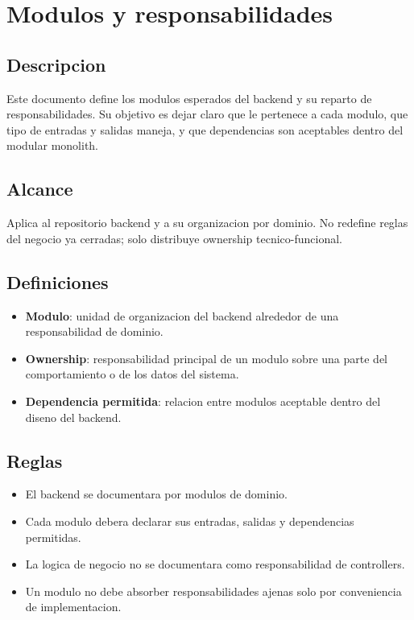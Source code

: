 \section{Modulos y responsabilidades}

\subsection{Descripcion}

Este documento define los modulos esperados del backend y su reparto de responsabilidades. Su objetivo es dejar claro que le pertenece a cada modulo, que tipo de entradas y salidas maneja, y que dependencias son aceptables dentro del modular monolith.

\subsection{Alcance}

Aplica al repositorio backend y a su organizacion por dominio. No redefine reglas del negocio ya cerradas; solo distribuye ownership tecnico-funcional.

\subsection{Definiciones}

\begin{itemize}
  \item \textbf{Modulo}: unidad de organizacion del backend alrededor de una responsabilidad de dominio.
  \item \textbf{Ownership}: responsabilidad principal de un modulo sobre una parte del comportamiento o de los datos del sistema.
  \item \textbf{Dependencia permitida}: relacion entre modulos aceptable dentro del diseno del backend.
\end{itemize}

\subsection{Reglas}

\begin{itemize}
  \item El backend se documentara por modulos de dominio.
  \item Cada modulo debera declarar sus entradas, salidas y dependencias permitidas.
  \item La logica de negocio no se documentara como responsabilidad de controllers.
  \item Un modulo no debe absorber responsabilidades ajenas solo por conveniencia de implementacion.
\end{itemize}


